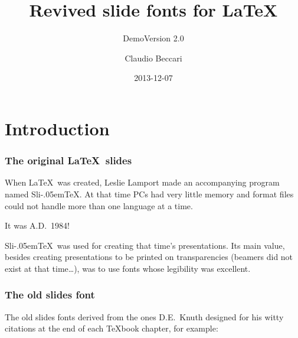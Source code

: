 \documentclass{beamer}\errorcontextlines=9
\title{Revived slide fonts for \LaTeX}
\subtitle{Demo\qquad Version 2.0}
\author{Claudio Beccari}
\date{2013-12-07}
\newcommand\SliTeX{Sli\kern-.05em\TeX}
\begin{document}


\begin{frame}
\titlepage
\end{frame}


\section{Introduction}

\begin{frame}\frametitle{The original \LaTeX\ slides}
When \LaTeX\ was created, Leslie Lamport made an accompanying program named \SliTeX. At that time PCs had very little memory and format files could not handle more than one language at a time.

\medskip

{\centering\alert{It was A.D.\ 1984!}\par}

\medskip

\SliTeX\ was used for creating that time's presentations. Its main value, besides creating presentations to be printed on transparencies (beamers did not exist at that time\dots), was to use fonts whose legibility was excellent.
\end{frame}

\begin{frame}\frametitle{The old slides font}
The old slides fonts derived from the ones D.E.\ Knuth designed for his witty citations at the end of each \TeX\-book chapter, for example:
\begin{quote}
\end{quote}
\end{frame}
\end{document}
